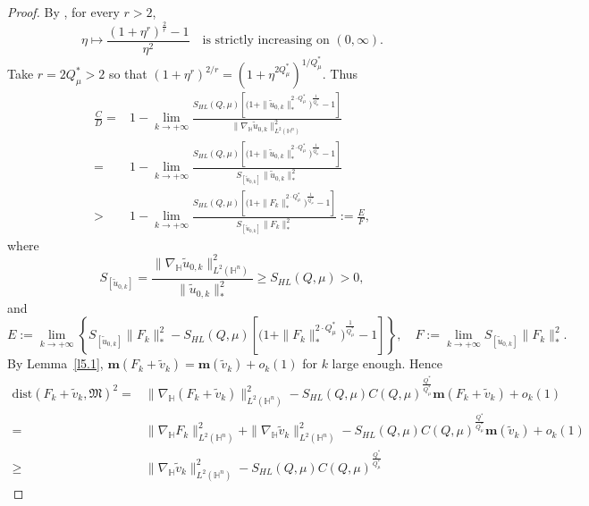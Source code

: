 \documentclass[11pt]{article}
\begin{document}
\begin{proof}
 {By \cite[Lemma 2.3]{K25}, for every $r>2$,
 \begin{equation}\label{K253}
 \eta\longmapsto \frac{(1+\eta^r)^{\frac{2}{r}}-1}{\eta^2}\quad\text{is strictly increasing on }(0,\infty).
 \end{equation}
Take $r=2Q^{\ast}_{\mu}>2$ so that $(1+\eta^r)^{2/r}=(1+\eta^{2Q^{\ast}_{\mu}})^{1/Q^{\ast}_{\mu}}$. Thus}
 \begin{align*}
 \frac{C}{D}=&1-\lim\limits_{k\rightarrow+\infty}\frac{S_{HL}(Q,\mu) \left[\Big(1+\|\tilde{u}_{0,k}\|_*^{2\cdot Q^{\ast}_{\mu}}\Big)^{\frac{1}{Q^{\ast}_{\mu}}}-1\right]}{\|\nabla_\mathbb{H} \tilde{u}_{0,k}\|_{L^2(\mathbb{H}^n)}^2}\\
 =&1-\lim\limits_{k\rightarrow+\infty}\frac{S_{HL}(Q,\mu) \left[\Big(1+\|\tilde{u}_{0,k}\|_*^{2\cdot Q^{\ast}_{\mu}}\Big)^{\frac{1}{Q^{\ast}_{\mu}}}-1\right]}{S_{[\tilde{u}_{0,k}]}\|\tilde{u}_{0,k}\|_*^2}\\
 >&1-\lim\limits_{k\rightarrow+\infty}\frac{S_{HL}(Q,\mu) \left[\Big(1+\|F_k\|_*^{2\cdot Q^{\ast}_{\mu}}\Big)^{\frac{1}{Q^{\ast}_{\mu}}}-1\right]}{S_{[\tilde{u}_{0,k}]}\|F_k\|_*^2}:=\frac{E}{F},
 \end{align*}
 where
 \begin{equation*}
 S_{[\tilde{u}_{0,k}]}=\frac{\|\nabla_\mathbb{H} \tilde{u}_{0,k}\|_{L^2(\mathbb{H}^n)}^2}{\|\tilde{u}_{0,k}\|_*^2}\geq S_{HL}(Q,\mu)>0,
 \end{equation*}
 and
 \begin{equation*}
 E:=\lim\limits_{k\rightarrow+\infty}\left\{S_{[\tilde{u}_{0,k}]}\|F_k\|_*^2-S_{HL}(Q,\mu) \left[\Big(1+\|F_k\|_*^{2\cdot Q^{\ast}_{\mu}}\Big)^{\frac{1}{Q^{\ast}_{\mu}}}-1\right]\right\},\quad F:=\lim\limits_{k\rightarrow+\infty}S_{[\tilde{u}_{0,k}]}\|F_k\|_*^2.
 \end{equation*}
 {By Lemma~\ref{l5.1}, $\mathbf{m}(F_k+\tilde{v}_k)=\mathbf{m}(\tilde{v}_k)+o_k(1)$ for $k$ large enough. Hence}
 \begin{align*}
 \mathrm{dist}(F_k+\tilde{v}_k,\mathfrak{M})^2=&\|\nabla_\mathbb{H} (F_k+\tilde{v}_k)\|_{L^2(\mathbb{H}^n)}^2-S_{HL}(Q,\mu)C(Q,\mu)^{\frac{Q^{\ast}}{Q^{\ast}_{\mu}}}
 \mathbf{m}(F_k+\tilde{v}_k)+o_k(1)\\
 =&\|\nabla_\mathbb{H} F_k\|_{L^2(\mathbb{H}^n)}^2+\|\nabla_\mathbb{H}\tilde{v}_k\|_{L^2(\mathbb{H}^n)}^2-S_{HL}(Q,\mu)C(Q,\mu)^{\frac{Q^{\ast}}{Q^{\ast}_{\mu}}}
 \mathbf{m}(\tilde{v}_k)+o_k(1)\\
 \geq &\|\nabla_\mathbb{H}\tilde{v}_k\|_{L^2(\mathbb{H}^n)}^2-S_{HL}(Q,\mu)C(Q,\mu)^{\frac{Q^{\ast}}{Q^{\ast}_{\mu}}}

\end{align*}
\end{proof}
\end{document}
